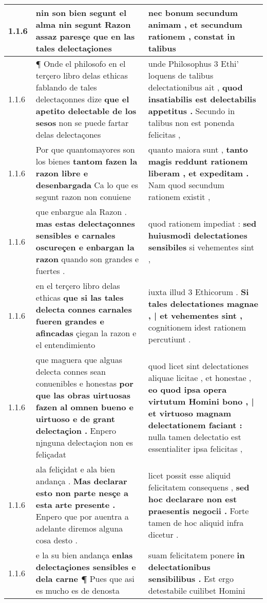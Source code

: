 \begin{tabular}{|p{1cm}|p{6.5cm}|p{6.5cm}|}
1.1.6 & nin son bien segunt el alma \textbf{ nin segunt Razon assaz paresçe } que en las tales delectaçiones & nec bonum secundum animam , \textbf{ et secundum rationem , } constat in talibus \\\hline
1.1.6 & ¶ Onde el philosofo en el terçero libro delas ethicas fablando de tales delectaçonnes dize \textbf{ que el apetito delectable de los sesos } non se puede fartar delas delectaçones & unde Philosophus 3 Ethi’ loquens de talibus delectationibus ait , \textbf{ quod insatiabilis est delectabilis appetitus . } Secundo in talibus non est ponenda felicitas , \\\hline
1.1.6 & Por que quantomayores son los bienes \textbf{ tantom fazen la razon libre e desenbargada } Ca lo que es segunt razon non conuiene & quanto maiora sunt , \textbf{ tanto magis reddunt rationem liberam , et expeditam . } Nam quod secundum rationem existit , \\\hline
1.1.6 & que enbargue ala Razon . \textbf{ mas estas delectaçonnes sensibles e carnales oscureçen e enbargan la razon } quando son grandes e fuertes . & quod rationem impediat : \textbf{ sed huiusmodi delectationes sensibiles } si vehementes sint , \\\hline
1.1.6 & en el terçero libro delas ethicas \textbf{ que si las tales delecta connes carnales fueren grandes e afincadas } çiegan la razon e el entendimiento & iuxta illud 3 Ethicorum . \textbf{ Si tales delectationes magnae , | et vehementes sint , } cognitionem idest rationem percutiunt . \\\hline
1.1.6 & que maguera que alguas delecta connes sean conuenibles e honestas \textbf{ por que las obras uirtuosas fazen al omnen bueno e uirtuoso e de grant delectaçion . } Enpero njnguna delectaçion non es feliçadat & quod licet sint delectationes aliquae licitae , et honestae , \textbf{ eo quod ipsa opera virtutum Homini bono , | et virtuoso magnam delectationem faciant : } nulla tamen delectatio est essentialiter ipsa felicitas , \\\hline
1.1.6 & ala feliçidat e ala bien andança . \textbf{ Mas declarar esto non parte nesçe a esta arte presente . } Enpero que por auentra a adelante diremos alguna cosa desto . & licet possit esse aliquid felicitatem consequens , \textbf{ sed hoc declarare non est praesentis negocii . } Forte tamen de hoc aliquid infra dicetur . \\\hline
1.1.6 & e la su bien andança \textbf{ enlas delectaçiones sensibles e dela carne ¶ } Pues que asi es mucho es de denosta & suam felicitatem ponere \textbf{ in delectationibus sensibilibus . } Est ergo detestabile cuilibet Homini \\\hline

\end{tabular}
